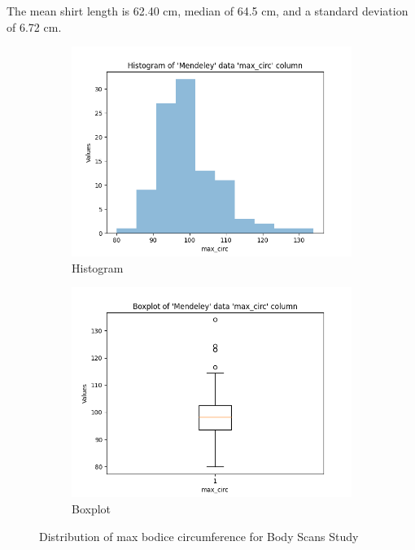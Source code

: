 The mean shirt length is 62.40 cm, median of 64.5 cm, and a standard deviation of 6.72 cm. 

\begin{figure}[htb]
    \centering
    \begin{subfigure}[b]{0.45\textwidth}
        \centering
        \includegraphics[width=\textwidth]{Images/Mendeley_max_circ_Hist.png}
        \caption{Histogram}
    \end{subfigure}
    \hfill
    \begin{subfigure}[b]{0.45\textwidth}
        \centering
        \includegraphics[width=\textwidth]{Images/Mendeley_max_circ_Boxplot.png}
        \caption{Boxplot}
    \end{subfigure}
    \caption{Distribution of max bodice circumference for Body Scans Study}
\end{figure}

